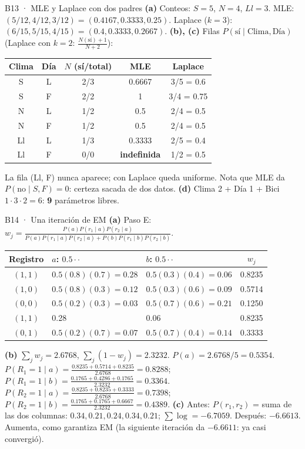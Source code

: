 \begin{solucion}{B13 · MLE y Laplace con dos padres}
\textbf{(a)} Conteos: $S=5$, $N=4$, $Ll=3$. MLE: $(5/12,4/12,3/12)=(0.4167,0.3333,0.25)$. Laplace ($k=3$): $(6/15,5/15,4/15)=(0.4,0.3333,0.2667)$.
\textbf{(b), (c)} Filas $P(\text{sí}\mid\text{Clima},\text{Día})$ (Laplace con $k=2$: $\frac{N(\text{sí})+1}{N+2}$):
\begin{center}\small
\begin{tabular}{cc|ccc}
Clima & Día & $N$ (sí/total) & MLE & Laplace\\\hline
S & L & 2/3 & 0.6667 & 3/5 = 0.6\\
S & F & 2/2 & 1 & 3/4 = 0.75\\
N & L & 1/2 & 0.5 & 2/4 = 0.5\\
N & F & 1/2 & 0.5 & 2/4 = 0.5\\
Ll & L & 1/3 & 0.3333 & 2/5 = 0.4\\
Ll & F & 0/0 & \textbf{indefinida} & 1/2 = 0.5
\end{tabular}
\end{center}
La fila (Ll, F) nunca aparece; con Laplace queda uniforme. Nota que MLE da $P(\text{no}\mid S,F)=0$: certeza sacada de dos datos.
\textbf{(d)} Clima 2 + Día 1 + Bici $1\cdot3\cdot2=6$: \textbf{9} parámetros libres.
\end{solucion}

\begin{solucion}{B14 · Una iteración de EM}
\textbf{(a)} Paso E: $w_j=\frac{P(a)P(r_1\mid a)P(r_2\mid a)}{P(a)P(r_1\mid a)P(r_2\mid a)+P(b)P(r_1\mid b)P(r_2\mid b)}$.
\begin{center}\small
\begin{tabular}{c|ll|c}
Registro & $a$: $0.5\cdot\cdot$ & $b$: $0.5\cdot\cdot$ & $w_j$\\\hline
$(1,1)$ & $0.5(0.8)(0.7)=0.28$ & $0.5(0.3)(0.4)=0.06$ & 0.8235\\
$(1,0)$ & $0.5(0.8)(0.3)=0.12$ & $0.5(0.3)(0.6)=0.09$ & 0.5714\\
$(0,0)$ & $0.5(0.2)(0.3)=0.03$ & $0.5(0.7)(0.6)=0.21$ & 0.1250\\
$(1,1)$ & 0.28 & 0.06 & 0.8235\\
$(0,1)$ & $0.5(0.2)(0.7)=0.07$ & $0.5(0.7)(0.4)=0.14$ & 0.3333
\end{tabular}
\end{center}
\textbf{(b)} $\sum_jw_j=2.6768$, $\sum_j(1-w_j)=2.3232$.
$P(a)=2.6768/5=\mathbf{0.5354}$.
$P(R_1{=}1\mid a)=\frac{0.8235+0.5714+0.8235}{2.6768}=\mathbf{0.8288}$; \quad
$P(R_1{=}1\mid b)=\frac{0.1765+0.4286+0.1765}{2.3232}=\mathbf{0.3364}$.
$P(R_2{=}1\mid a)=\frac{0.8235+0.8235+0.3333}{2.6768}=\mathbf{0.7398}$; \quad
$P(R_2{=}1\mid b)=\frac{0.1765+0.1765+0.6667}{2.3232}=\mathbf{0.4389}$.
\textbf{(c)} Antes: $P(r_1,r_2)$ = suma de las dos columnas: $0.34,0.21,0.24,0.34,0.21$; $\sum\log=\mathbf{-6.7059}$.
Después: $\mathbf{-6.6613}$. Aumenta, como garantiza EM (la siguiente iteración da $-6.6611$: ya casi convergió).
\end{solucion}


